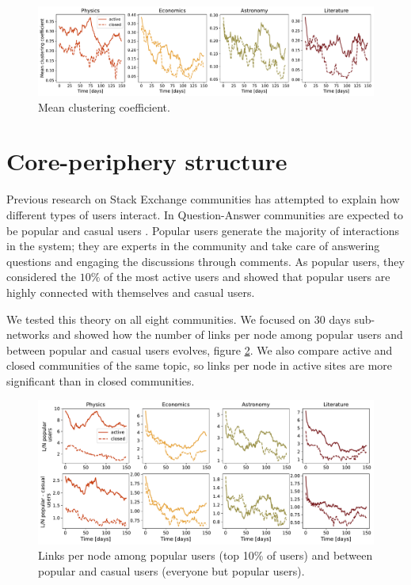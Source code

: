 \begin{figure}
	\centering
	\includegraphics[width=\linewidth]{figures/stackexchange/clustering.pdf}%
	\caption{Mean clustering coefficient.}
	\label{fig:clustering}
\end{figure}

\section{Core-periphery structure}

Previous research on Stack Exchange communities has attempted to explain how different types of users interact. In Question-Answer communities are expected to be popular and casual users \cite{santos2019activity, santos2019self}. Popular users generate the majority of interactions in the system; they are experts in the community and take care of answering questions and engaging the discussions through comments. As popular users, they considered the $10 \%$ of the most active users and showed that popular users are highly connected with themselves and casual users.

We tested this theory on all eight communities. We focused on 30 days sub-networks and showed how the number of links per node among popular users and between popular and casual users evolves, figure \ref{fig:pop_cas_users}. We also compare active and closed communities of the same topic, so links per node in active sites are more significant than in closed communities.

\begin{figure}[h!]
	\centering
	\includegraphics[width=\linewidth]{figures/stackexchange/popular_casual_users.pdf}
	\caption{Links per node among popular users (top 10\% of users) and between popular and casual users (everyone but popular users).}
	\label{fig:pop_cas_users}
\end{figure} 


